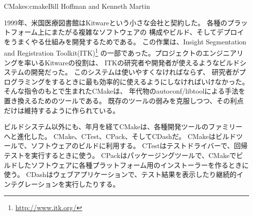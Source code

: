 \begin{aosachapter}{CMake}{s:cmake}{Bill Hoffman and Kenneth Martin}

1999年、米国医療図書館はKitwareという小さな会社と契約した。
各種のプラットフォーム上にまたがる複雑なソフトウェアの
構成やビルド、そしてデプロイをうまくやる仕組みを開発するためである。
この作業は、Insight Segmentation and Registration Toolkit(ITK)\footnote{\url{http://www.itk.org/}}
の一部であった。プロジェクトのエンジニアリングを率いるKitwareの役割は、
ITKの研究者や開発者が使えるようなビルドシステムの開発だった。
このシステムは使いやすくなければならず、
研究者がプログラミングをするときに最も効率的に使えるようにしなければいけなかった。
そんな指令のもとで生まれたCMakeは、
年代物のautoconf/libtoolによる手法を置き換えるためのツールである。
既存のツールの弱みを克服しつつ、その利点だけは維持するように作られている。

ビルドシステム以外にも、年月を経てCMakeは、各種開発ツールのファミリーへと進化した。
CMake、CTest、CPack、そしてCDashだ。
CMakeはビルドツールで、ソフトウェアのビルドに利用する。
CTestはテストドライバーで、回帰テストを実行するときに使う。
CPackはパッケージングツールで、CMakeでビルドしたソフトウェアに各種プラットフォーム用のインストーラーを作るときに使う。
CDashはウェブアプリケーションで、テスト結果を表示したり継続的インテグレーションを実行したりする。


\end{aosachapter}

